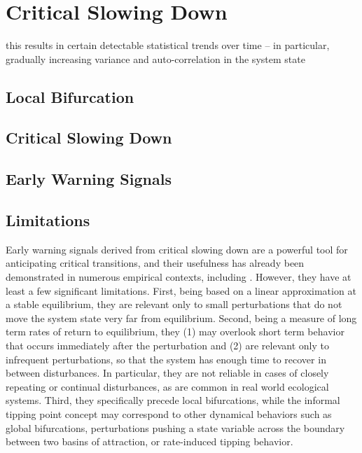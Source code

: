 \section{Critical Slowing Down}
\label{sec:csd}

this results in certain detectable statistical trends over time -- in particular, gradually increasing variance and auto-correlation in the system state

\subsection{Local Bifurcation}

\subsection{Critical Slowing Down}

\subsection{Early Warning Signals}

\subsection{Limitations}
	
Early warning signals derived from critical slowing down are a powerful tool for anticipating critical transitions, and their usefulness has already been demonstrated in numerous empirical contexts, including . However, they have at least a few significant limitations. 
%
First, being based on a linear approximation at a stable equilibrium, they are relevant only to small perturbations that do not move the system state very far from equilibrium. 
%
Second, being a measure of long term rates of return to equilibrium, they (1) may overlook short term behavior that occurs immediately after the perturbation and (2) are relevant only to infrequent perturbations, so that the system has enough time to recover in between disturbances. In particular, they are not reliable in cases of closely repeating or continual disturbances, as are common in real world ecological systems. 
%
Third, they specifically precede local bifurcations, while the informal tipping point concept may correspond to other dynamical behaviors such as global bifurcations, perturbations pushing a state variable across the boundary between two basins of attraction, or rate-induced tipping behavior. 